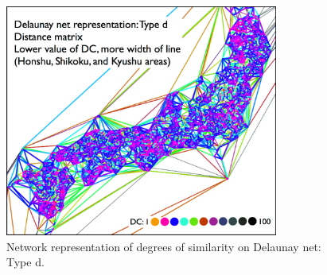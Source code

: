 \documentclass[output=paper]{LSP/langsci}
\begin{document}
\begin{figure}
\includegraphics[width=0.8\textwidth]{illustrations/kuma_fig23}
\caption{Network representation of degrees of similarity on Delaunay net: Type d.}
\label{fig:23}
\end{figure}          
\end{document}
